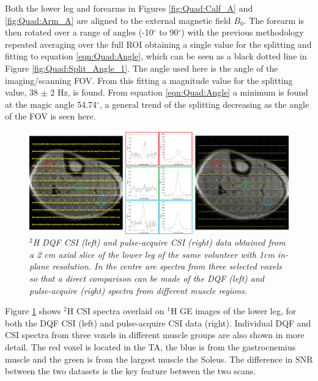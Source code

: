 Both the lower leg and forearms in Figures \ref{fig:Quad:Calf_A} and \ref{fig:Quad:Arm_A} are aligned to the external magnetic field $B_0$. The forearm is then rotated over a range of angles (-10$^\circ$ to 90$^\circ$) with the previous methodology repeated averaging over the full \ac{ROI} obtaining a single value for the splitting and fitting to equation \ref{eqn:Quad:Angle}, which can be seen as a black dotted line in Figure \ref{fig:Quad:Split_Angle_1}. The angle used here is the angle of the imaging/scanning \ac{FOV}. From this fitting a magnitude value for the splitting value, 38 $\pm$ 2 Hz, is found. From equation \ref{eqn:Quad:Angle} a minimum is found at the magic angle 54.74$^\circ$, a general trend of the splitting decreasing as the angle of the \ac{FOV} is seen here.

\begin{figure}
    \centering
    \includegraphics[width=1\textwidth]{Figures/Quad/SQFDQF_CSI_1.png}
    \caption{\textit{$^2$H \ac{DQF} \ac{CSI} (left) and pulse-acquire \ac{CSI} (right) data obtained from a 2 cm axial slice of the lower leg of the same volunteer with 1cm in-plane resolution. In the centre are spectra from three selected voxels so that a direct comparison can be made of the \ac{DQF} (left) and pulse-acquire (right) spectra from different muscle regions.}}
    \label{fig:Quad:SQFDQF_1}
\end{figure}

Figure \ref{fig:Quad:SQFDQF_1} shows $^2$H \ac{CSI} spectra overlaid on $^1$H \ac{GE} images of the lower leg, for both the \ac{DQF} \ac{CSI} (left) and pulse-acquire \ac{CSI} data (right). Individual \ac{DQF} and \ac{CSI} spectra from three voxels in different muscle groups are also shown in more detail. The red voxel is located in the \ac{TA}, the blue is from the gastrocnemius muscle and the green is from the largest muscle the Soleus. The difference in \ac{SNR} between the two datasets is the key feature between the two scans.

